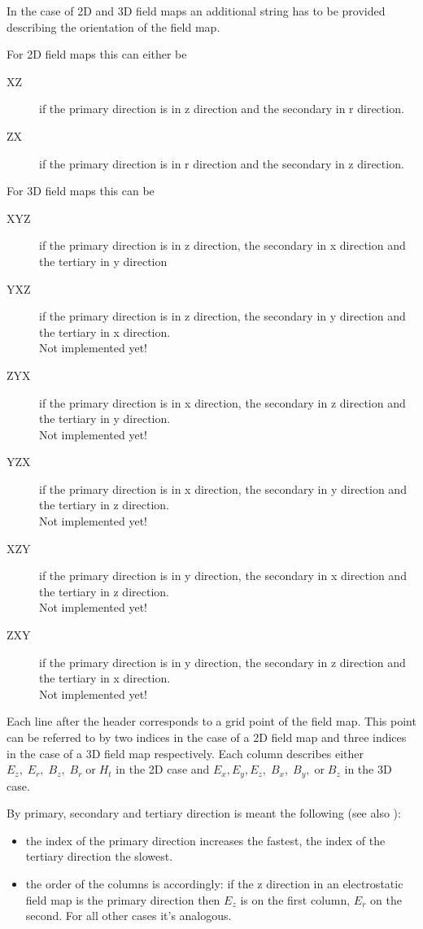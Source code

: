 In the case of 2D and 3D field maps an additional string has to be provided describing the orientation of the field map.

For 2D field maps this can either be
\begin{description}
\item[XZ]
if the primary direction is in z direction and the secondary in r direction.
\item[ZX]
if the primary direction is in r direction and the secondary in z direction.
\end{description}

For 3D field maps this can be
\begin{description}
\item[XYZ]
if the primary direction is in z direction, the secondary in x direction and the tertiary in y direction
\item[YXZ]
if the primary direction is in z direction, the secondary in y direction and the tertiary in x direction.\\
Not implemented yet!
\item[ZYX]
if the primary direction is in x direction, the secondary in z direction and the tertiary in y direction.\\
Not implemented yet!
\item[YZX]
if the primary direction is in x direction, the secondary in y direction and the tertiary in z direction.\\
Not implemented yet!
\item[XZY]
if the primary direction is in y direction, the secondary in x direction and the tertiary in z direction.\\
Not implemented yet!
\item[ZXY]
if the primary direction is in y direction, the secondary in z direction and the tertiary in x direction.\\
Not implemented yet!
\end{description}

Each line after the header corresponds to a grid point of the field map. This point can be referred to by two indices in the case of a 2D field map and three indices in the case of a 3D field map respectively. Each column describes either $E_z,\; E_r,\; B_z,\; B_r\; \text{or}\;H_t$ in the 2D case and $E_x, E_y, E_z,\; B_x,\; B_y,\;\text{or}\; B_z$ in the 3D case.

By primary, secondary and tertiary direction is meant the following (see also ):
\begin{itemize}
\item
the index of the primary direction increases the fastest, the index of the tertiary direction the slowest.
\item
the order of the columns is accordingly: if the z direction in an electrostatic field map is the primary direction then $E_z$ is on the first column, $E_r$ on the second. For all other cases it's analogous.
\end{itemize}

